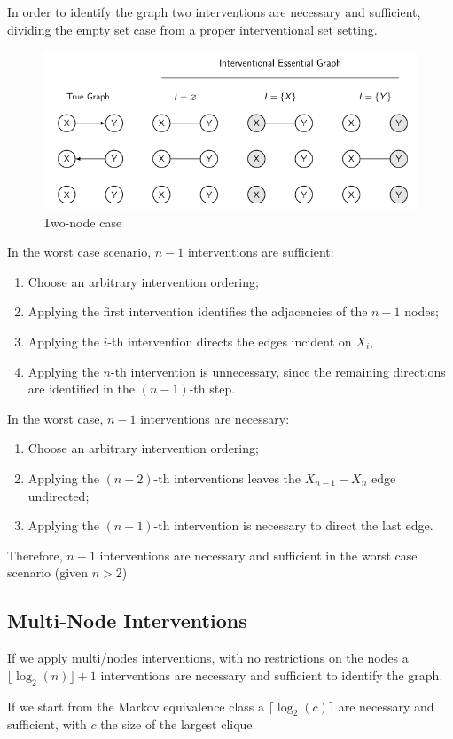 In order to identify the graph two interventions are necessary and sufficient,
dividing the empty set case from a proper interventional set setting.

\begin{figure}[!ht]
    \centering
    \includegraphics[width=\textwidth]{img/causal_discovery/twonodecase.png}
    \caption{Two-node case}
    \label{fig:twonodecase}
\end{figure}

In the worst case scenario, $n- 1$ interventions are sufficient:
\begin{enumerate}
    \item Choose an arbitrary intervention ordering;
    \item Applying the first intervention identifies the adjacencies of the $n - 1$
          nodes;
    \item Applying the $i$-th intervention directs the edges incident on $X_i$,
    \item Applying the $n$-th intervention is unnecessary, since the remaining
          directions are identified in the $(n-1)$-th step.
\end{enumerate}
In the worst case, $n-1$ interventions are necessary:
\begin{enumerate}
    \item Choose an arbitrary intervention ordering;
    \item Applying the $(n-2)$-th interventions leaves the $X_{n - 1} - X_n$ edge
          undirected;
    \item Applying the $(n-1)$-th intervention is necessary to direct the last
          edge.
\end{enumerate}
Therefore, $n-1$ interventions are necessary and sufficient in the worst case
scenario (given $n > 2$)
\subsection{Multi-Node Interventions}
If we apply multi/nodes interventions, with no restrictions on the nodes a
$\lfloor \log_2(n) \rfloor + 1$ interventions are necessary and sufficient to
identify the graph.

If we start from the Markov equivalence class a $\lceil \log_2(c) \rceil$ are
necessary and sufficient, with $c$ the size of the largest clique.